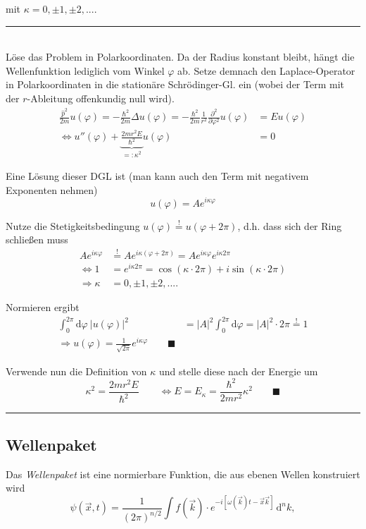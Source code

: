 \documentclass{article}
\newcommand{\diff}{\mathrm{d}}
\begin{document}
mit $\kappa = 0, \pm 1, \pm 2, ...$.


\newpage


{\color{violet}
\hrule 
	\\
	Löse das Problem in Polarkoordinaten. Da der Radius konstant bleibt, hängt die Wellenfunktion lediglich vom Winkel $\varphi$ ab. Setze demnach den Laplace-Operator in Polarkoordinaten in die stationäre Schrödinger-Gl. ein (wobei der Term mit der $r$-Ableitung offenkundig null wird).
		\begin{align*}
			\frac{\hat{p}^2}{2m} u(\varphi) = -\frac{\hbar^2}{2m} \Delta u(\varphi) = -\frac{\hbar^2}{2m} \frac{1}{r^2}\frac{\partial^2}{\partial \varphi^2} u(\varphi) &= E u(\varphi) \\
			\Leftrightarrow u''(\varphi) + \underbrace{ \frac{2m r^2 E}{\hbar^2} }_{=:\kappa^2} u(\varphi) &= 0
		\end{align*}

Eine Lösung dieser DGL ist (man kann auch den Term mit negativem Exponenten nehmen)
	$$u(\varphi) = A e^{i\kappa\varphi}$$

	Nutze die Stetigkeitsbedingung $u(\varphi) \stackrel{!}{=} u(\varphi + 2\pi)$, d.h. dass sich der Ring schließen muss
		\begin{align*}
			A e^{i\kappa\varphi} &\stackrel{!}{=} A e^{i\kappa(\varphi + 2\pi)} = A e^{i\kappa\varphi} e^{i\kappa 2\pi} \\
			\Leftrightarrow 1 &= e^{i\kappa 2\pi} = \cos(\kappa \cdot 2\pi) + i \sin(\kappa \cdot 2\pi) \\
			\Rightarrow \kappa &= 0, \pm 1, \pm 2, ....
		\end{align*}

	Normieren ergibt
		\begin{align*}
			\int_0^{2\pi} \diff\varphi\ |u(\varphi)|^2 &= |A|^2 \int_0^{2\pi} \diff\varphi = |A|^2 \cdot 2\pi \stackrel{!}{=} 1 \\
			\Rightarrow u(\varphi) = \frac{1}{\sqrt{2\pi}} e^{i\kappa\varphi} \qquad\blacksquare
		\end{align*}

	Verwende nun die Definition von $\kappa$ und stelle diese nach der Energie um
		$$\kappa^2 = \frac{2mr^2E}{\hbar^2} \qquad	\Leftrightarrow E = E_\kappa = \frac{\hbar^2}{2mr^2}\kappa^2 \qquad\blacksquare$$

\hrule
}


\newpage


\subsection{Wellenpaket}
Das \textit{Wellenpaket} ist eine normierbare Funktion, die aus ebenen Wellen konstruiert wird
	\begin{equation}
		\psi(\vec{x},t) = \frac{1}{(2\pi)^{n/2}} \int f(\vec{k}) \cdot e^{-i[\omega(\vec{k}) t - \vec{x}\vec{k}]} \,\diff^n k,
	\end{equation}
\end{document}
